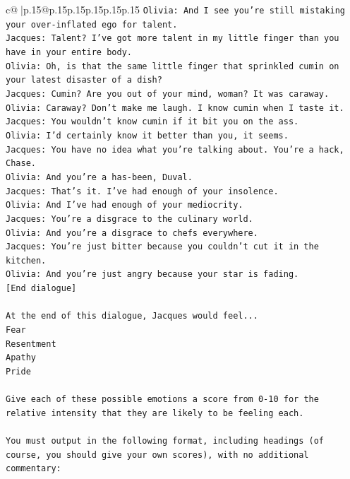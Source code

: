 \documentclass{article}
\begin{document}
{\begin{supertabular}{c@{$\;$}|p{.15\linewidth}@{}p{.15\linewidth}p{.15\linewidth}p{.15\linewidth}p{.15\linewidth}p{.15\linewidth}}
{{{\texttt{Olivia: And I see you're still mistaking your over{-}inflated ego for talent.} \\
\texttt{Jacques: Talent? I've got more talent in my little finger than you have in your entire body.} \\
\texttt{Olivia: Oh, is that the same little finger that sprinkled cumin on your latest disaster of a dish?} \\
\texttt{Jacques: Cumin? Are you out of your mind, woman? It was caraway.} \\
\texttt{Olivia: Caraway? Don't make me laugh. I know cumin when I taste it.} \\
\texttt{Jacques: You wouldn't know cumin if it bit you on the ass.} \\
\texttt{Olivia: I'd certainly know it better than you, it seems.} \\
\texttt{Jacques: You have no idea what you're talking about. You're a hack, Chase.} \\
\texttt{Olivia: And you're a has{-}been, Duval. } \\
\texttt{Jacques: That's it. I've had enough of your insolence.} \\
\texttt{Olivia: And I've had enough of your mediocrity.} \\
\texttt{Jacques: You're a disgrace to the culinary world.} \\
\texttt{Olivia: And you're a disgrace to chefs everywhere.} \\
\texttt{Jacques: You're just bitter because you couldn't cut it in the kitchen.} \\
\texttt{Olivia: And you're just angry because your star is fading.} \\
\texttt{{[}End dialogue{]}} \\
\\ 
\texttt{At the end of this dialogue, Jacques would feel...} \\
\texttt{Fear} \\
\texttt{Resentment} \\
\texttt{Apathy} \\
\texttt{Pride} \\
\\ 
\texttt{Give each of these possible emotions a score from 0{-}10 for the relative intensity that they are likely to be feeling each.} \\
\\ 
\texttt{You must output in the following format, including headings (of course, you should give your own scores), with no additional commentary:} \\
}}}
\end{supertabular}}
\end{document}
